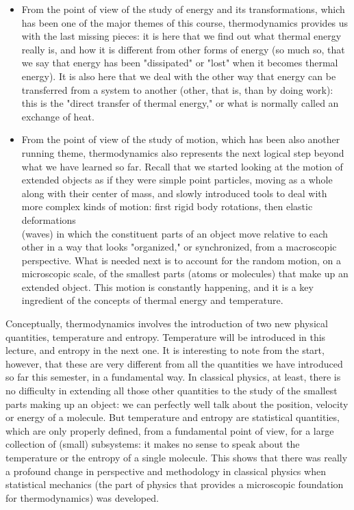 \documentclass[10pt]{article}
\begin{document}
\begin{itemize}
  \item From the point of view of the study of energy and its transformations, which has been one of the major themes of this course, thermodynamics provides us with the last missing pieces: it is here that we find out what thermal energy really is, and how it is different from other forms of energy (so much so, that we say that energy has been "dissipated" or "lost" when it becomes thermal energy). It is also here that we deal with the other way that energy can be transferred from a system to another (other, that is, than by doing work): this is the "direct transfer of thermal energy," or what is normally called an exchange of heat.
  \item From the point of view of the study of motion, which has been also another running theme, thermodynamics also represents the next logical step beyond what we have learned so far. Recall that we started looking at the motion of extended objects as if they were simple point particles, moving as a whole along with their center of mass, and slowly introduced tools to deal with more complex kinds of motion: first rigid body rotations, then elastic deformations\\
(waves) in which the constituent parts of an object move relative to each other in a way that looks "organized," or synchronized, from a macroscopic perspective. What is needed next is to account for the random motion, on a microscopic scale, of the smallest parts (atoms or molecules) that make up an extended object. This motion is constantly happening, and it is a key ingredient of the concepts of thermal energy and temperature.
\end{itemize}

Conceptually, thermodynamics involves the introduction of two new physical quantities, temperature and entropy. Temperature will be introduced in this lecture, and entropy in the next one. It is interesting to note from the start, however, that these are very different from all the quantities we have introduced so far this semester, in a fundamental way. In classical physics, at least, there is no difficulty in extending all those other quantities to the study of the smallest parts making up an object: we can perfectly well talk about the position, velocity or energy of a molecule. But temperature and entropy are statistical quantities, which are only properly defined, from a fundamental point of view, for a large collection of (small) subsystems: it makes no sense to speak about the temperature or the entropy of a single molecule. This shows that there was really a profound change in perspective and methodology in classical physics when statistical mechanics (the part of physics that provides a microscopic foundation for thermodynamics) was developed.
\end{document}
